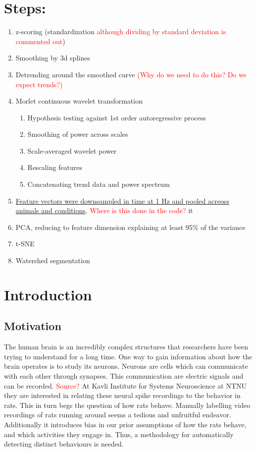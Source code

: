 \documentclass{article}
\theoremstyle{plain}
\theoremstyle{definition}
\theoremstyle{remark}
\begin{document}
\section{Steps:}
\begin{enumerate}
        \item z-scoring (standardization \textcolor{red}{although dividing by standard deviation is commented out})
        \item Smoothing by 3d splines
        \item Detrending around the smoothed curve \textcolor{red}{(Why do we need to do this? Do we expect trends?)}
        \item Morlet continuous wavelet transformation
                \begin{enumerate}
                        \item Hypothesis testing against 1st order autoregressive process
                        \item Smoothing of power across scales
                        \item Scale-averaged wavelet power
                        \item Rescaling features
                        \item Concatenating trend data and power spectrum
                \end{enumerate}
        \item \underline{Feature vectors were downsampled in time at 1 Hz and pooled acreoss animals and conditions}. \textcolor{red}{Where is this done in the code?}
        it
        \item PCA, reducing to feature dimension explaining at least 95\% of the variance
        \item t-SNE
        \item Watershed segmentation
\end{enumerate}
\newpage



\section{Introduction}
\subsection{Motivation}
The human brain is an incredibly complex structures that researchers have been trying to understand for a long time.
One way to gain information about how the brain operates is to study its neurons.
Neurons are cells which can communicate with each other through synapses.
This communication are electric signals and can be recorded.
\textcolor{red}{Source?}
At Kavli Institute for Systems Neuroscience at NTNU they are interested in relating these neural spike recordings to the behavior in rats.
This in turn begs the question of how rats behave.
Manually labelling video recordings of rats running around seems a tedious and unfruitful endeavor.
Additionally it introduces bias in our prior assumptions of how the rats behave, and which activities they engage in.
Thus, a methodology for automatically detecting distinct behaviours is needed.
\end{document}
